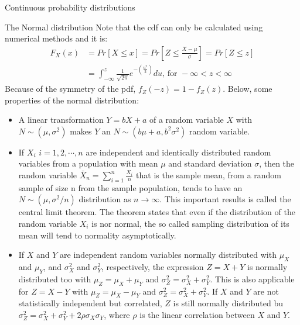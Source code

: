 \documentclass[8pt]{beamer}
\renewcommand{\emph}[1]{\textcolor{myorange}{#1}}
\begin{document}
\begin{frame}{Continuous probability distributions} 
    \begin{block}{The \alert{Normal} distribution}
        \vspace{-4pt}
        Note that the \emph{cdf} can only be calculated using numerical methods and it is:
        \vspace{-5pt}
            \begin{align*}
                F_X (x) &= Pr[X \leq x] = Pr\left[ Z \leq \frac{X-\mu}{\sigma} \right] = Pr [Z \leq z] \\
                        &=\int_{-\infty}^z \frac{1}{\sqrt{2\pi}} e^{- \left(\frac{u^2}{2}\right)} du, \, \text{for } -\infty < z < \infty  
            \end{align*}
            Because of the symmetry of the \emph{pdf}, $f_Z(-z) = 1-f_Z(z)$. Below, some properties of the normal distribution:
        \vspace{-3pt}
        \begin{itemize}
            \item A linear transformation $Y = bX +a$  of a random variable $X$ with $N\sim(\mu,\sigma^2)$ makes $Y$ an  $N\sim(b\mu +a,b^2 \sigma^2)$ random variable. 
            \item If $X_i$ $i=1,2, \cdots, n$ are independent and identically distributed random variables from a population with mean $\mu$ and standard deviation $\sigma$, then the random variable $\bar{X}_n = \sum_{i=1}^n \frac{X_i}{n}$ that is the sample mean, from a random sample of size n from the sample population, tends to have  an $N\sim(\mu,\sigma^2 /n)$ distribution as $n \rightarrow \infty$. This important results is called the \alert{central limit theorem}. The theorem states that even if the distribution of the random variable $X_i$ is nor normal, the so called sampling distribution of its mean will tend to normality asymptotically. 
            \item If $X$ and $Y$ are independent random variables normally distributed with $\mu_X$ and $\mu_Y$, and $\sigma_X^2$ and  $\sigma_Y^2$, respectively, the expression $Z=X+Y$ is normally distributed too with $\mu_Z = \mu_X + \mu_Y$ and $\sigma_Z^2 = \sigma_X^2 + \sigma_Y^2$. This is also applicable for $Z = X-Y$ with $\mu_Z = \mu_X - \mu_Y$ and $\sigma_Z^2 = \sigma_X^2 + \sigma_Y^2$. If $X$ and $Y$ are not statistically independent but correlated, $Z$ is still normally distributed bu $\sigma_Z^2 = \sigma_X^2 + \sigma_Y^2 + 2\rho \sigma_X \sigma_Y$, where $\rho$ is the linear correlation between $X$ and $Y$.
        \end{itemize}
    \end{block}
                
\end{frame}
\end{document}
